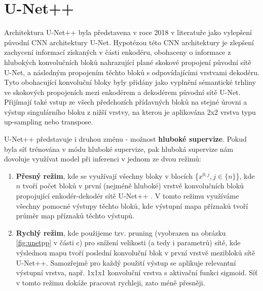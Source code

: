 \section{U-Net++}
\label{sec:Chapter23}

Architektura U-Net++ byla představena v roce 2018 v literatuře \cite{unetpp} jako vylepšení původní CNN architektury U-Net. Hypotézou této CNN architektury je zlepšení zachycení informací získaných v části enkodéru, obohaceny o informace z hlubokých konvolučních bloků nahrazující plané skokové propojení původní sítě U-Net, a následným propojením těchto bloků s odpovídajícími vrstvami dekodéru. Tyto obohacující konvoluční bloky byly přidány jako vyplnění sémantické trhliny ve skokových propojeních mezi enkodérem a dekodérem původní sítě U-Net. Přijímají také vstup ze všech předchozích přídavných bloků na stejné úrovni a výstup singulárního bloku z nižší vrstvy, na kterou je aplikována 2x2 vrstva typu up-sampling nebo transpose. 

U-Net++ představuje i druhou změnu - možnost \textbf{hluboké supervize}. Pokud byla síť trénována v módu hluboké supervize, pak hluboká supervize nám dovoluje využívat model při inferenci v jednom ze dvou režimů:

\begin{enumerate}
    \item \textbf{Přesný režim}, kde se využívají všechny bloky v blocích \{\(x^{0, j}, j \in \{n\}\)\}, kde \(n\) tvoří počet bloků v první (nejméně hluboké) vrstvě konvolučních bloků propojující enkodér-dekodér sítě U-Net++ \cite{unetpp}. V tomto režimu využíváme všechny pomocné výstupy těchto bloků, kde výstupní mapa příznaků tvoří průměr map příznaků těchto výstupů.
    \item \textbf{Rychlý režim}, kde použijeme tzv. pruning (vyobrazen na obrázku \ref{fig:unetpp} v části c) pro snížení velikosti (a tedy i parametrů) sítě, kde výslednou mapu tvoří poslední konvoluční blok v první vrstvě mezibloků sítě U-Net++. Samozřejmě pro každý použití výstup se aplikuje relevantní výstupní vrstva, např. 1x1x1 konvoluční vrstva s aktivační funkci sigmoid. Síť v tomto režimu dokáže pracovat rychleji, zato méně přesněji.
\end{enumerate}

